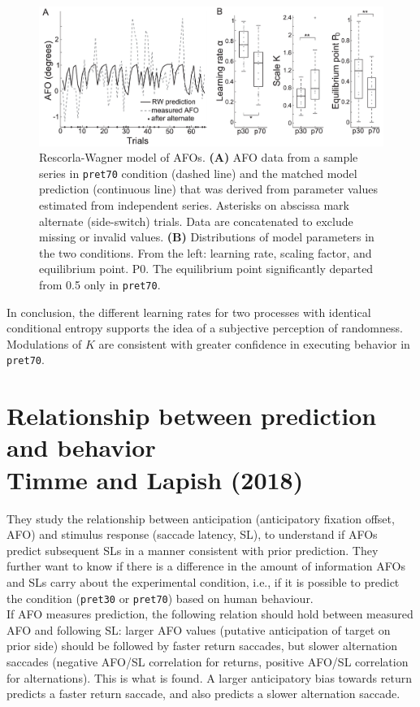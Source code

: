 \begin{figure}[!ht]
    \centering
    \captionsetup{width=.8\linewidth}
    \includegraphics[width=0.75\linewidth]{images/rescorla.png}
    \caption*{Rescorla-Wagner model of AFOs. \textbf{(A)} AFO data from a sample series in \texttt{pret70} condition (dashed line) and the matched model prediction (continuous line) that was derived from parameter values estimated from independent series. Asterisks on abscissa mark alternate (side-switch) trials. Data are concatenated to exclude missing or invalid values. \textbf{(B)} Distributions of model parameters in the two conditions. From the left: learning rate, scaling factor, and equilibrium point. P0. The equilibrium point significantly departed from 0.5 only in \texttt{pret70}.}
    \label{fig:rescorla}
\end{figure}

In conclusion, the different learning rates for two processes with identical conditional entropy supports the idea of a subjective perception of randomness. Modulations of $K$ are consistent with greater confidence in executing behavior in \texttt{pret70}.

\section[Relationship between prediction and behavior]{Relationship between prediction and behavior\\ Timme and Lapish (2018)
}
They study the relationship between anticipation (anticipatory fixation offset, AFO) and stimulus response (saccade latency, SL), to understand if AFOs predict subsequent SLs in a manner consistent with prior prediction. They further want to know if there is a difference in the amount of information AFOs and SLs carry about the experimental condition, i.e., if it is possible to predict the condition (\texttt{pret30} or \texttt{pret70}) based on human behaviour.\\

If AFO measures prediction, the following relation should hold between measured AFO and following SL: larger AFO values (putative anticipation of target on prior side) should be followed by faster return saccades, but slower alternation saccades (negative AFO/SL correlation for returns, positive AFO/SL correlation for alternations). This is what is found. A larger anticipatory bias towards return predicts a faster return saccade, and also predicts a slower alternation saccade.\\

